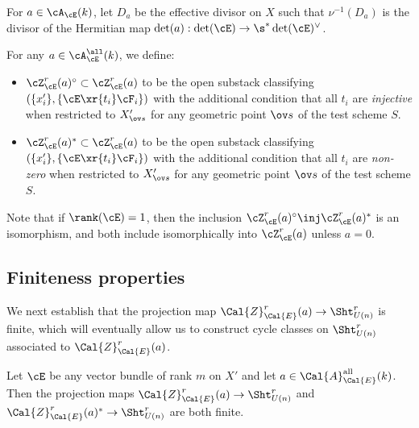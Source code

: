 \begin{defn}
\notready\label{def:Da}
For $a\in \cA_{\cE}(k)$, let $D_{a}$ be the effective divisor on $X$ such that $\nu^{-1}(D_{a})$ is the divisor of the Hermitian map $\det(a): \det(\cE)\to \s^{*}\det(\cE)^{\vee}$.
\end{defn}


\begin{defn}
\notready\label{def:Z(0)}
For any $a \in \cA_{\cE}^{\all}(k)$, we define:
\begin{itemize}
\item $\cZ_{\cE}^{r}(a)^{\circ}\subset\cZ^{r}_{\cE}(a)$ to be the open substack classifying $(\{x'_{i}\}, \{\cE\xr{t_{i}}\cF_{i}\})$ with the additional condition that all $t_{i}$ are \emph{injective} when restricted to $X'_{\ov s}$ for any geometric point $\ov s$ of the test scheme $S$.
\item $\cZ_{\cE}^{r}(a)^{*}\subset\cZ^{r}_{\cE}(a)$ to be the open substack classifying $(\{x'_{i}\}, \{\cE\xr{t_{i}}\cF_{i}\})$ with the additional condition that all $t_{i}$ are \emph{non-zero} when restricted to $X'_{\ov s}$ for any geometric point $\ov s$ of the test scheme $S$.
\end{itemize}
Note that if $\rank(\cE)=1$, then the inclusion $\cZ_{\cE}^{r}(a)^{\circ} \inj \cZ_{\cE}^{r}(a)^{*}$ is an isomorphism, and both include isomorphically into $\cZ_{\cE}^r(a)$ unless $a=0$.
\end{defn}

\subsection{Finiteness properties}

We next establish that the projection map $\Cal{Z}_{\Cal{E}}^{r}(a) \rightarrow \Sht_{U(n)}^{r}$ is finite, which will eventually allow us to construct cycle classes on $ \Sht_{U(n)}^{r}$ associated to $\Cal{Z}_{\Cal{E}}^{r}(a) $.

\begin{prop}
\notready\label{prop: Z finite}
Let $\cE$ be any vector bundle of rank $m$ on $X'$ and let  $a \in \Cal{A}^{\rm all}_{\Cal{E}}(k)$. Then the projection maps $\Cal{Z}_{\Cal{E}}^{r}(a) \rightarrow \Sht_{U(n)}^{r}$ and $\Cal{Z}_{\Cal{E}}^{r}(a)^* \rightarrow \Sht_{U(n)}^{r}$ are both finite.
\end{prop}


